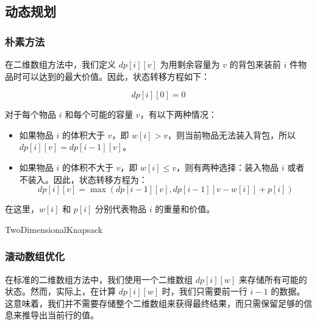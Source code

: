 \documentclass[UTF8,titlepage]{ctexart}
\numberwithin{figure}{section}
\begin{document}
\subsection{动态规划}

\subsubsection{朴素方法}

在二维数组方法中，我们定义 $dp[i][v]$ 为用剩余容量为 $v$ 的背包来装前 $i$ 件物品时可以达到的最大价值。因此，状态转移方程如下：

\[ dp[i][0] = 0 \]

对于每个物品 $i$ 和每个可能的容量 $v$，有以下两种情况：

\begin{itemize}
  \item 如果物品 $i$ 的体积大于 $v$，即 $w[i] > v$，则当前物品无法装入背包，所以 $dp[i][v] = dp[i-1][v]$。
  \item 如果物品 $i$ 的体积不大于 $v$，即 $w[i] \leq v$，则有两种选择：装入物品 $i$ 或者不装入。因此，状态转移方程为：
  \[ dp[i][v] = \max(dp[i-1][v], dp[i-1][v-w[i]] + p[i]) \]
\end{itemize}

在这里，$w[i]$ 和 $p[i]$ 分别代表物品 $i$ 的重量和价值。

\begin{algorithm}[H]
\SetAlgoLined
\DontPrintSemicolon
{}
\caption{TwoDimensionalKnapsack}
\end{algorithm}

\subsubsection{滚动数组优化}
在标准的二维数组方法中，我们使用一个二维数组 $dp[i][w]$ 来存储所有可能的状态。然而，实际上，在计算 $dp[i][w]$ 时，我们只需要前一行 $i-1$ 的数据。这意味着，我们并不需要存储整个二维数组来获得最终结果，而只需保留足够的信息来推导出当前行的值。
\end{document}
